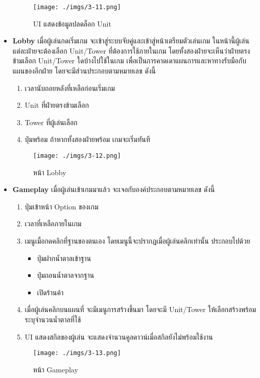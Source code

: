 \documentclass[12pt,oneside,openright,a4paper]{cpe-thai-project}
\begin{document}
\begin{itemize}
  \begin{figure}[H]\centering
    \texttt{[image: ./imgs/3-11.png]}
    \caption{UI แสดงข้อมูลปลดล็อก Unit}\label{fig:3-11}
  \end{figure}


  \item \textbf{Lobby} เมื่อผู้เล่นกดเริ่มเกม จะเข้าสู่ระบบจับคู่และเข้าสู่หน้าเตรียมตัวเล่นเกม 
  ในหน้านี้ผู้เล่นแต่ละฝ่ายจะต้องเลือก Unit/Tower ที่ต้องการใช้ภายในเกม 
  โดยทั้งสองฝ่ายจะเห็นว่าฝ่ายตรงข้ามเลือก Unit/Tower ใดบ้างไปใช้ในเกม 
  เพื่อเป็นการคาดเดาแผนการและหาทางรับมือกับแผนของอีกฝ่าย โดยจะมีส่วนประกอบตามหมายเลข ดังนี้
  \begin{enumerate}
    \item เวลานับถอยหลังที่เหลือก่อนเริ่มเกม
    \item Unit ที่ฝ่ายตรงข้ามเลือก
    \item Tower ที่ผู้เล่นเลือก
    \item ปุ่มพร้อม ถ้าหากทั้งสองฝ่ายพร้อม เกมจะเริ่มทันที
  \end{enumerate}

  \begin{figure}[H]\centering
    \texttt{[image: ./imgs/3-12.png]}
    \caption{หน้า Lobby}\label{fig:3-12}
  \end{figure}
  
\pagebreak
  \item \textbf{Gameplay} เมื่อผู้เล่นเข้าเกมมาแล้ว จะเจอกับองค์ประกอบตามหมายเลข ดังนี้
  \begin{enumerate}
    \item ปุ่มเข้าหน้า Option ของเกม
    \item เวลาที่เหลือภายในเกม
    \item เมนูเมื่อกดคลิกที่ฐานของตนเอง โดยเมนูนี้จะปรากฎเมื่อผู้เล่นคลิกเท่านั้น ประกอบไปด้วย
    \begin{itemize}
      \item ปุ่มฝากน้ำตาลเข้าฐาน
      \item ปุ่มถอนน้ำตาลจากฐาน
      \item เปิดร้านค้า
    \end{itemize}
    \item เมื่อผู้เล่นคลิกบนแผนที่ จะมีเมนูการสร้างขึ้นมา 
    โดยจะมี Unit/Tower ให้เลือกสร้างพร้อมระบุจำนวนน้ำตาลที่ใช้
    \item UI แสดงสกิลของผู้เล่น จะแสดงจำนวนคูลดาวน์เมื่อสกิลยังไม่พร้อมใช้งาน
  \end{enumerate}

  \begin{figure}[H]\centering
    \texttt{[image: ./imgs/3-13.png]}
    \caption{หน้า Gameplay}\label{fig:3-13}
  \end{figure}
  


\end{itemize}
\end{document}
